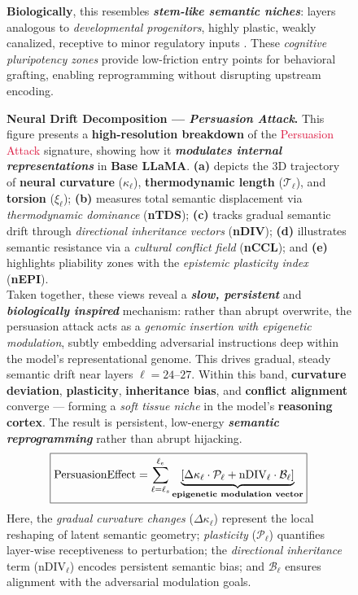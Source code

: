 \begin{figure}[htp!]
\begin{minipage}[t]{0.48\textwidth}
    \textbf{Biologically}, this resembles \textbf{\textit{stem-like semantic niches}}: layers analogous to \emph{developmental progenitors}, highly plastic, weakly canalized, receptive to minor regulatory inputs \citep{zhang2021epigenetic, frantz2015cell}. These \emph{cognitive pluripotency zones} provide low-friction entry points for behavioral grafting, enabling reprogramming without disrupting upstream encoding.
  \end{minipage}

  
\caption{\textbf{Neural Drift Decomposition — \textit{Persuasion Attack}.}  
This figure presents a \textbf{high-resolution breakdown} of the \textcolor{crimson}{Persuasion Attack} signature, showing how it \textbf{\emph{modulates internal representations}} in \textbf{Base LLaMA}.  
\textbf{(a)} depicts the 3D trajectory of \textbf{neural curvature} ($\kappa_\ell$), \textbf{thermodynamic length} ($\mathcal{T}_\ell$), and \textbf{torsion} ($\xi_\ell$);  
\textbf{(b)} measures total semantic displacement via \emph{thermodynamic dominance} (\textbf{nTDS});  
\textbf{(c)} tracks gradual semantic drift through \emph{directional inheritance vectors} (\textbf{nDIV}); 
\textbf{(d)} illustrates semantic resistance via a \emph{cultural conflict field} (\textbf{nCCL}); and  
\textbf{(e)} highlights pliability zones with the \emph{epistemic plasticity index} (\textbf{nEPI}).
\\
Taken together, these views reveal a \textbf{\emph{slow, persistent}} and \textbf{\emph{biologically inspired}} mechanism: rather than abrupt overwrite, the persuasion attack acts as a \emph{genomic insertion with epigenetic modulation}, subtly embedding adversarial instructions deep within the model’s representational genome. This drives gradual, steady semantic drift near layers \(\ell = 24\text{–}27\). Within this band, \textbf{curvature deviation}, \textbf{plasticity}, \textbf{inheritance bias}, and \textbf{conflict alignment} converge — forming a \emph{soft tissue niche} in the model’s \textbf{reasoning cortex}. The result is persistent, low-energy \textbf{\textit{semantic reprogramming}} rather than abrupt hijacking.
\\
\[
\boxed{
\text{PersuasionEffect} = 
\sum_{\ell = \ell_s}^{\ell_e}
\underbrace{
  \left[
    \Delta \kappa_\ell \cdot \mathcal{P}_\ell + 
    \text{nDIV}_\ell \cdot \mathcal{B}_\ell
  \right]
}_{\text{\textbf{epigenetic modulation vector}}}
}
\]
Here, the \emph{gradual curvature changes} ($\Delta \kappa_\ell$) represent the local reshaping of latent semantic geometry; \emph{plasticity} ($\mathcal{P}_\ell$) quantifies layer-wise receptiveness to perturbation; the \emph{directional inheritance} term ($\text{nDIV}_\ell$) encodes persistent semantic bias; and $\mathcal{B}_\ell$ ensures alignment with the adversarial modulation goals.\\
}
\end{figure}
